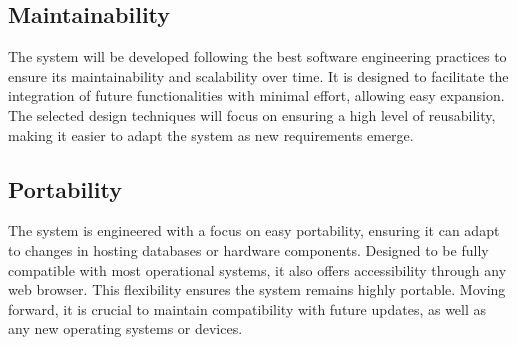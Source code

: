 \subsection{Maintainability}
The system will be developed following the best software engineering practices to ensure its maintainability and scalability over time. It is designed to facilitate the integration of future functionalities with minimal effort, allowing easy expansion. The selected design techniques will focus on ensuring a high level of reusability, making it easier to adapt the system as new requirements emerge.

\subsection{Portability}
The system is engineered with a focus on easy portability, ensuring it can adapt to changes in hosting databases or hardware components. Designed to be fully compatible with most operational systems, it also offers accessibility through any web browser. This flexibility ensures the system remains highly portable. Moving forward, it is crucial to maintain compatibility with future updates, as well as any new operating systems or devices.




